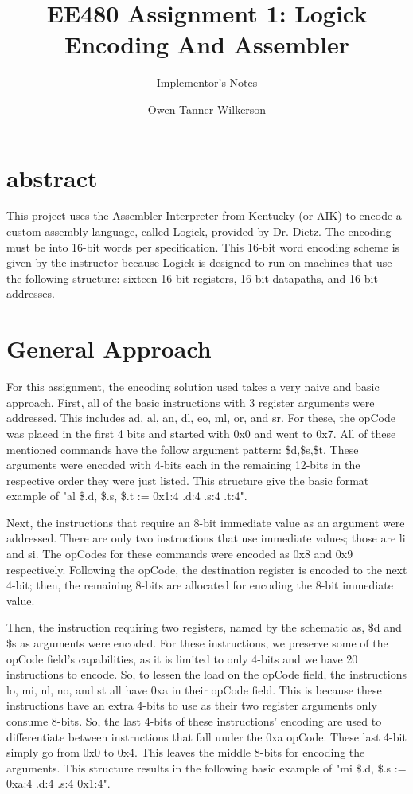 \documentclass[sigconf]{acmart}
\begin{document}
\title{EE480 Assignment 1: Logick Encoding And Assembler}
\subtitle{Implementor's Notes}

\author{
Owen Tanner Wilkerson\\
}

\maketitle

\section{abstract}
This project uses the Assembler Interpreter from Kentucky (or AIK) to encode a custom assembly language, called Logick, provided by Dr. Dietz. The encoding must be into 16-bit words per specification. This 16-bit word encoding scheme is given by the instructor because Logick is designed to run on machines that use the following structure: sixteen 16-bit registers, 16-bit datapaths, and 16-bit addresses.


\section{General Approach}

\tab For this assignment, the encoding solution used takes a very naive and basic approach. First, all of the basic instructions with 3 register arguments were addressed. This includes ad, al, an, dl, eo, ml, or, and sr. For these, the opCode was placed in the first 4 bits and started with 0x0 and went to 0x7. All of these mentioned commands have the follow argument pattern: \$d,\$s,\$t. These arguments were encoded with 4-bits each in the remaining 12-bits in the respective order they were just listed. This structure give the basic format example of "al	\$.d, \$.s, \$.t	:=	0x1:4	.d:4	.s:4	.t:4".

Next, the instructions that require an 8-bit immediate value as an argument were addressed. There are only two instructions that use immediate values; those are li and si. The opCodes for these commands were encoded as 0x8 and 0x9 respectively. Following the opCode, the destination register is encoded to the next 4-bit; then, the remaining 8-bits are allocated for encoding the 8-bit immediate value.

Then, the instruction requiring two registers, named by the schematic as, \$d and \$s as arguments were encoded. For these instructions, we preserve some of the opCode field's capabilities, as it is limited to only 4-bits and we have 20 instructions to encode. So, to lessen the load on the opCode field, the instructions lo, mi, nl, no, and st all have 0xa in their opCode field. This is because these instructions have an extra 4-bits to use as their two register arguments only consume 8-bits. So, the last 4-bits of these instructions' encoding are used to differentiate between instructions that fall under the 0xa opCode. These last 4-bit simply go from 0x0 to 0x4. This leaves the middle 8-bits for encoding the arguments. This structure results in the following basic example of "mi	\$.d, \$.s	:=	0xa:4	.d:4	.s:4	0x1:4".
\end{document}
